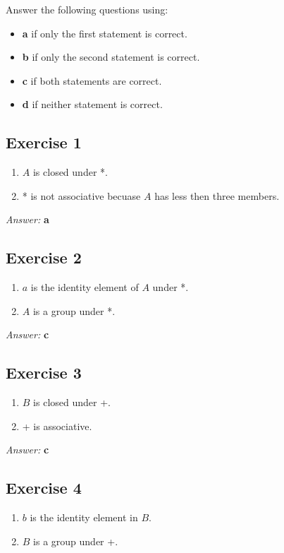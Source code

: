 \documentclass[11pt]{article}
\begin{document}
Answer the following questions using:

\begin{itemize}
\item \textbf{a} if only the first statement is correct.
\item \textbf{b} if only the second statement is correct.
\item \textbf{c} if both statements are correct.
\item \textbf{d} if neither statement is correct.
\end{itemize}

\subsection{Exercise 1}
\label{sec-2-1}
\begin{enumerate}
\item $A$ is closed under *.
\item * is not associative becuase $A$ has less then three members.
\end{enumerate}

\emph{Answer:} \textbf{a}
\subsection{Exercise 2}
\label{sec-2-2}
\begin{enumerate}
\item $a$ is the identity element of $A$ under *.
\item $A$ is a group under *.
\end{enumerate}

\emph{Answer:} \textbf{c}
\subsection{Exercise 3}
\label{sec-2-3}
\begin{enumerate}
\item $B$ is closed under +.
\item + is associative.
\end{enumerate}

\emph{Answer:} \textbf{c}
\subsection{Exercise 4}
\label{sec-2-4}
\begin{enumerate}
\item $b$ is the identity element in $B$.
\item $B$ is a group under +.
\end{enumerate}
\end{document}

